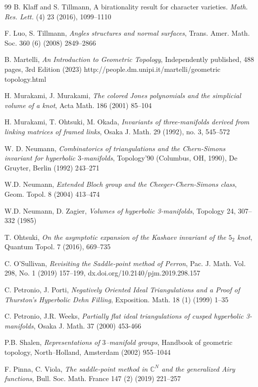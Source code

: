 \documentclass[11pt]{amsart}
\newcommand{\mc}{\mathbb{C}}
\begin{document}
\begin{thebibliography}{99}
 B. Klaff and S. Tillmann, A birationality result for character varieties. \emph{Math. Res. Lett.} (4) 23 (2016), 1099--1110

 F. Luo, S. Tillmann, {\it Angles structures and normal surfaces}, Trans. Amer. Math. Soc. 360 (6) (2008) 2849--2866

 B. Martelli, \emph{An Introduction to Geometric Topology}, Independently published, 488 pages, 3rd Edition (2023) http://people.dm.unipi.it/martelli/geometric${}_{}$topology.html 

 H. Murakami, J. Murakami, \emph{The colored Jones polynomials and the simplicial volume of a knot}, Acta Math. 186 (2001) 85--104

 H. Murakami, T. Ohtsuki, M. Okada, \emph{Invariants of three-manifolds derived from linking matrices of framed links}, Osaka J. Math. 29 (1992), no. 3, 545–572

 W. D. Neumann, \emph{Combinatorics of triangulations and the Chern-Simons invariant for hyperbolic $3$-manifolds}, Topology'90 (Columbus, OH, 1990), De Gruyter, Berlin (1992) 243--271   

 W.D. Neumann, {\it Extended Bloch group and the Cheeger-Chern-Simons class}, Geom. Topol. 8 (2004) 413--474

 W.D. Neumann, D. Zagier, {\it Volumes of hyperbolic 3-manifolds}, Topology 24, 307--332 (1985) 

 T. Ohtsuki, {\it On the asymptotic expansion of the Kashaev invariant of the $5_2$ knot}, Quantum Topol. 7 (2016), 669--735 

 C. O'Sullivan, \emph{Revisiting the Saddle-point method of Perron}, Pac. J. Math. Vol. 298, No. 1 (2019)  157--199, dx.doi.org/10.2140/pjm.2019.298.157

 C. Petronio, J. Porti, \emph{Negatively Oriented Ideal Triangulations and a Proof of Thurston's Hyperbolic Dehn Filling}, Exposition. Math. 18 (1) (1999) 1--35

 C. Petronio, J.R. Weeks, \emph{Partially flat ideal triangulations of cusped hyperbolic 3-manifolds}, Osaka J. Math. 37 (2000) 453-466
 
 P.B. Shalen, \emph{Representations of $3$--manifold groups}, Handbook of geometric topology, North--Holland, Amsterdam (2002) 955--1044

 F. Pinna, C. Viola, \emph{The saddle-point method in $\mc^N$ and the generalized Airy functions}, Bull. Soc. Math. France 147 (2) (2019) 221--257


\end{thebibliography}
\end{document}
